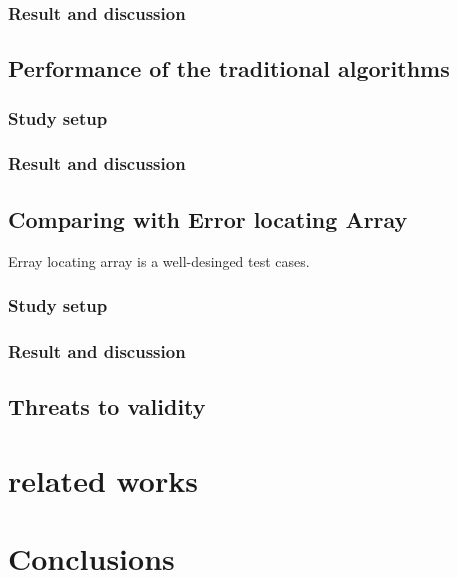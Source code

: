 \documentclass{sig-alternate}
\begin{document}
\subsubsection{Result and discussion}


\subsection{Performance of the traditional algorithms}

\subsubsection{Study setup}

\subsubsection{Result and discussion}


\subsection{Comparing with Error locating Array}
Erray locating array is a well-desinged test cases.


\subsubsection{Study setup}



\subsubsection{Result and discussion}


\subsection{Threats to validity}


\section{related works}


\section{Conclusions}
\end{document}
